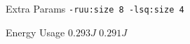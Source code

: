 
        \begin{tcolorbox}[width=\linewidth, colback=white!95!black, colframe=white!95!black]
            
            
            Extra Params \hfill \verb|-ruu:size 8 -lsq:size 4|

            Energy Usage \hfill \st{$0.293J$} $0.291J$

        \end{tcolorbox}
    